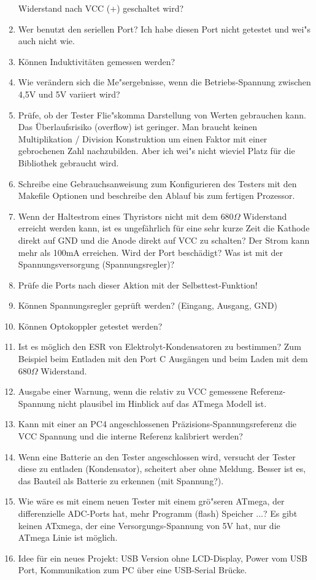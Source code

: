 \begin{enumerate}
Widerstand nach VCC (+) geschaltet wird?
\item Wer benutzt den seriellen Port? Ich habe diesen Port nicht getestet und wei"s auch nicht wie.
\item K\"onnen Induktivit\"aten gemessen werden?
\item Wie ver\"andern sich die Me"sergebnisse, wenn die Betriebs-Spannung zwischen 4,5V und 5V variiert wird?
\item Pr\"ufe, ob der Tester Flie"skomma Darstellung von Werten gebrauchen kann.
Das \"Uberlaufsrisiko (overflow) ist geringer.
Man braucht keinen Multiplikation / Division Konstruktion um einen Faktor mit einer gebrochenen Zahl nachzubilden.
Aber ich wei"s nicht wieviel Platz f\"ur die Bibliothek gebraucht wird.
\item Schreibe eine Gebrauchsanweisung zum Konfigurieren des Testers mit den Makefile Optionen und beschreibe
den Ablauf bis zum fertigen Prozessor.
\item Wenn der Haltestrom eines Thyristors nicht mit dem \(680\Omega\) Widerstand erreicht werden kann, 
ist es ungef\"ahrlich f\"ur eine sehr kurze Zeit die Kathode direkt auf GND und die Anode direkt auf VCC zu schalten?
Der Strom kann mehr als 100mA erreichen. Wird der Port besch\"adigt? Was ist mit der Spannungsversorgung (Spannungsregler)?
\item Pr\"ufe die Ports nach dieser Aktion mit der Selbsttest-Funktion!
\item K\"onnen Spannungsregler gepr\"uft werden? (Eingang, Ausgang, GND)
\item K\"onnen Optokoppler getestet werden?
\item Ist es m\"oglich den ESR von Elektrolyt-Kondensatoren zu bestimmen? Zum Beispiel beim Entladen mit den Port C Ausg\"angen und beim
Laden mit dem \(680\Omega\) Widerstand.
\item Ausgabe einer Warnung, wenn die relativ zu VCC gemessene Referenz-Spannung nicht plausibel im Hinblick auf das ATmega Modell ist.
\item Kann mit einer an PC4 angeschlossenen Pr\"azisions-Spannungsreferenz die VCC Spannung und die interne Referenz kalibriert werden?
\item Wenn eine Batterie an den Tester angeschlossen wird, versucht der Tester diese zu entladen (Kondensator),
scheitert aber ohne Meldung. Besser ist es, das Bauteil als Batterie zu erkennen (mit Spannung?).
\item Wie w\"are es mit einem neuen Tester mit einem gr\"o"seren ATmega, der differenzielle ADC-Ports hat,
mehr Programm (flash) Speicher ...?
Es gibt keinen ATxmega, der eine Versorgungs-Spannung von 5V hat, nur die ATmega Linie ist m\"oglich.
\item Idee f\"ur ein neues Projekt: USB  Version ohne LCD-Display, Power vom USB Port, Kommunikation zum PC \"uber eine USB-Serial Br\"ucke.
\end{enumerate}
